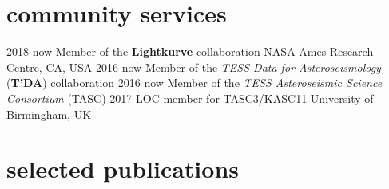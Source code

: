 \documentclass[]{k-cv} %
\begin{document}
\clearpage
{}

\section{\color{c1}community services}
\begin{entrylist}
	\centrythree
	{2018 \to now}
	{Member of the \textbf{\textcolor{c1}{Lightkurve}} collaboration}
	{NASA Ames Research Centre, CA, USA}
	\centrythree
	{2016 \to now}
	{Member of the \emph{TESS Data for Asteroseismology} (\textbf{\textcolor{c1}{T'DA}}) collaboration }
	{}
	\centrythree
	{2016 \to now}
	{Member of the \emph{TESS Asteroseismic Science Consortium} (TASC)}
	{}
	\centrythree
	{2017}
	{LOC member for TASC3/KASC11}
	{University of Birmingham, UK}
\end{entrylist}





\section{\color{c2}selected publications}
\vspace{-0.5cm}
\end{document}
